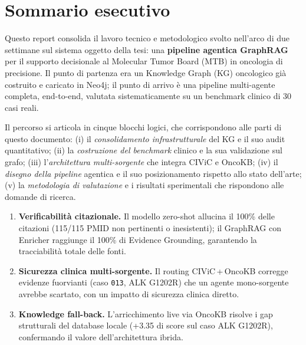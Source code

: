 \documentclass[11pt,a4paper]{article}
\newcommand{\bench}[1]{\texttt{\small #1}}
\begin{document}
\section*{Sommario esecutivo}

Questo report consolida il lavoro tecnico e metodologico svolto nell'arco di due settimane sul sistema oggetto della tesi: una \textbf{pipeline agentica GraphRAG} per il supporto decisionale al Molecular Tumor Board (MTB) in oncologia di precisione. Il punto di partenza era un Knowledge Graph (KG) oncologico gi\`a costruito e caricato in Neo4j; il punto di arrivo \`e una pipeline multi-agente completa, end-to-end, valutata sistematicamente su un benchmark clinico di 30 casi reali.

Il percorso si articola in cinque blocchi logici, che corrispondono alle parti di questo documento: (i) il \emph{consolidamento infrastrutturale} del KG e il suo audit quantitativo; (ii) la \emph{costruzione del benchmark} clinico e la sua validazione sul grafo; (iii) l'\emph{architettura multi-sorgente} che integra CIViC e OncoKB; (iv) il \emph{disegno della pipeline} agentica e il suo posizionamento rispetto allo stato dell'arte; (v) la \emph{metodologia di valutazione} e i risultati sperimentali che rispondono alle domande di ricerca.

\begin{insightbox}
\begin{enumerate}[leftmargin=1.4em]
\item \textbf{Verificabilit\`a citazionale.} Il modello zero-shot allucina il 100\% delle citazioni (115/115 PMID non pertinenti o inesistenti); il GraphRAG con Enricher raggiunge il 100\% di Evidence Grounding, garantendo la tracciabilit\`a totale delle fonti.
\item \textbf{Sicurezza clinica multi-sorgente.} Il routing CIViC\,+\,OncoKB corregge evidenze fuorvianti (caso \bench{013}, ALK G1202R) che un agente mono-sorgente avrebbe scartato, con un impatto di sicurezza clinica diretto.
\item \textbf{Knowledge fall-back.} L'arricchimento live via OncoKB risolve i gap strutturali del database locale (+3.35 di score sul caso ALK G1202R), confermando il valore dell'architettura ibrida.
\end{enumerate}
\end{insightbox}
\end{document}
